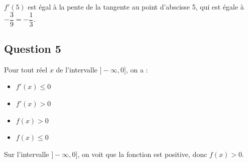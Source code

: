 \documentclass[10pt]{article}
\begin{document}
	$f'(5)$ est égal à la pente de la tangente au point d’abscisse 5, qui est égale à $-\dfrac{3}{9} = -\dfrac{1}{3}$.
	
	\subsection*{Question 5}
	Pour tout réel $x$ de l’intervalle $]-\infty, 0]$, on a :
	
	\begin{itemize}
		\item[a.] $f'(x) \leq 0$
		\item[b.] $f'(x) > 0$
		\item[c.] $f(x) > 0$
		\item[d.] $f(x) \leq 0$
	\end{itemize}
	
	Sur l’intervalle $]-\infty, 0]$, on voit que la fonction est positive, donc $f(x) > 0$.
	\medskip
\end{document}
